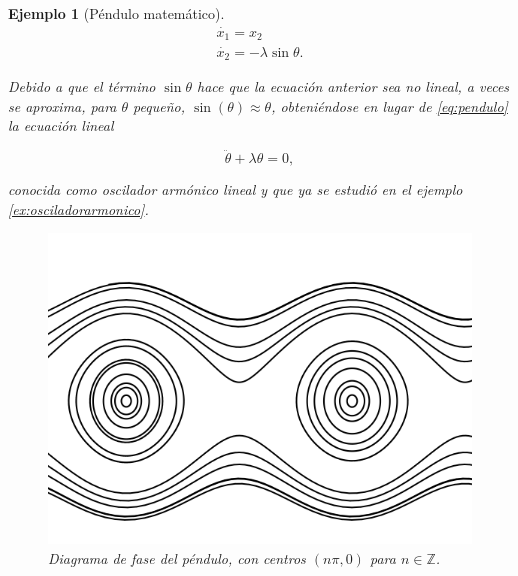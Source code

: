 \documentclass[11pt]{book}
\theoremstyle{definition}
\numberwithin{definition}{section}
\theoremstyle{theorem}
\numberwithin{theorem}{section}
\numberwithin{lemma}{section}
\numberwithin{corollary}{section}
\theoremstyle{plain}
\newtheorem{example}{Ejemplo}
\numberwithin{example}{section}
\newcommand{\Z}{{\ensuremath{\mathbb{Z}}}}
\begin{document}
\begin{example}[Péndulo matemático]
\begin{equation}
	\begin{array}{l}
		\dot{x_1} = x_2 \\
		\dot{x_2} = -\lambda \sin\theta.
	\end{array}
\end{equation}

Debido a que el término $\sin\theta$ hace que la ecuación anterior sea no lineal, a veces se aproxima, para $\theta$ pequeño, $\sin(\theta) \approx \theta$, obteniéndose en lugar de \ref{eq:pendulo} la ecuación lineal

$$ \ddot{\theta} + \lambda\theta = 0,$$

conocida como oscilador armónico lineal y que ya se estudió en el ejemplo \ref{ex:osciladorarmonico}.


\begin{figure}[!ht] \label{fig:pendulomatematico} \centering
	\includegraphics[scale=0.5]{figures/pendulomatematico-fase.png}
	\caption{Diagrama de fase del péndulo, con centros $(n\pi, 0)$ para $n \in \Z$.}
\end{figure}

\end{example}
\end{document}
